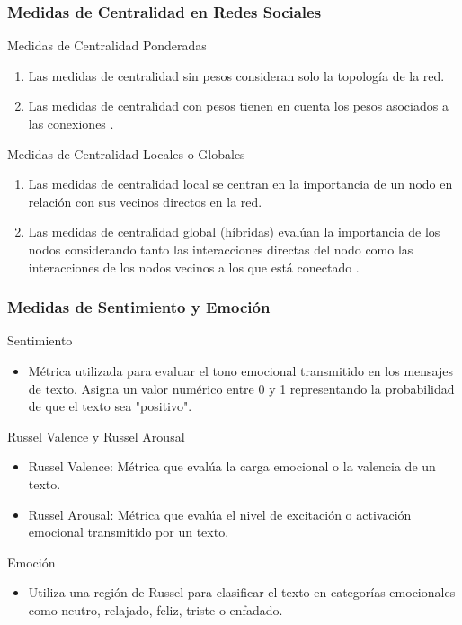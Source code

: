 \documentclass{beamer}
\begin{document}
\begin{frame}
	\frametitle{Medidas de Centralidad en Redes Sociales}
	
	\begin{block}{Medidas de Centralidad Ponderadas}
		\begin{enumerate}
			\item Las medidas de centralidad sin pesos consideran solo la topología de la red.
			\item Las medidas de centralidad con pesos tienen en cuenta los pesos asociados a las conexiones \citet{tang2010a, barrat2004a} .
		\end{enumerate}
	\end{block}
	
	\begin{block}{Medidas de Centralidad Locales o Globales}
		\begin{enumerate}
			\item Las medidas de centralidad local se centran en la importancia de un nodo en relación con sus vecinos directos en la red.
			\item Las medidas de centralidad global (híbridas) evalúan la importancia de los nodos considerando tanto las interacciones directas del nodo como las interacciones de los nodos vecinos a los que está conectado \citep{abbasi2013a, Mahmoud_2021}.
		\end{enumerate}
	\end{block}
	
\end{frame}



\begin{frame}
	\frametitle{Medidas de Sentimiento y Emoción}
	\begin{block}{Sentimiento}
		\begin{itemize}
			\item Métrica utilizada para evaluar el tono emocional transmitido en los mensajes de texto. Asigna un valor numérico entre 0 y 1 representando la probabilidad de que el texto sea "positivo".
		\end{itemize}
	\end{block}
	
	\begin{block}{Russel Valence y Russel Arousal}
		\begin{itemize}
			\item Russel Valence: Métrica que evalúa la carga emocional o la valencia de un texto.
			\item Russel Arousal: Métrica que evalúa el nivel de excitación o activación emocional transmitido por un texto.
		\end{itemize}
	\end{block}
	
	\begin{block}{Emoción}
		\begin{itemize}
			\item Utiliza una región de Russel para clasificar el texto en categorías emocionales como neutro, relajado, feliz, triste o enfadado.
		\end{itemize}
	\end{block}
	
\end{frame}
\end{document}
